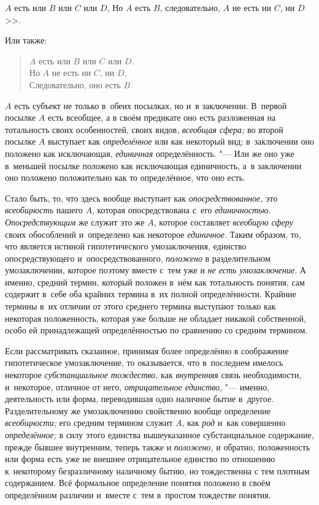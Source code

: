 $A$ есть или $B$ или $C$ или $D$,
Но $A$ есть $B$, следовательно, $A$ не есть ни $C$, ни $D$>>.

Или также:

\begin{verse}
$A$ есть или $B$ или $C$ или $D$.\\
Но $A$ не есть ни $C$, ни $D$,\\
Следовательно, оно есть $B$.
\end{verse}

$A$ есть субъект не только в~обеих посылках, но и~в заключении.
В~первой посылке $A$ есть всеобщее, а
в своём предикате оно есть разложенная на тотальность своих особенностей,
своих видов, {\em всеобщая сфера;} во второй посылке $A$
выступает как {\em определённое} или
как некоторый вид; в~заключении оно положено как исключающая, {\em единичная}
определённость. "--- Или же оно уже в~меньшей
посылке положено как исключающая единичность, а~в заключении оно положено
положительно как то определённое, что оно есть.

Стало быть, то, что здесь вообще выступает как {\em опосредствованное,}
это {\em всеобщность} нашего $A$, которая опосредствована с~его
{\em единичностью}. {\em Опосредствующим} же служит это же $A$,
которое составляет {\em всеобщую сферу}
своих обособлений и~определено как некоторое {\em единичное}. Таким
образом, то, что является истиной гипотетического умозаключения, единство
опосредствующего и~опосредствованного, {\em положено} в
разделительном умозаключении, которое поэтому вместе с~тем уже и
{\em не есть умозаключение}.
А именно, средний термин, который положен в~нём как
тотальность понятия, сам содержит в~себе оба крайних термина в~их полной
определённости. Крайние термины в~их отличии от этого среднего термина
выступают только как некоторая положенность, которая уже больше не обладает
никакой собственной, особо ей принадлежащей определённостью по сравнению со
средним термином.

Если рассматривать сказанное, принимая более определённо в
соображение гипотетическое умозаключение, то оказывается, что в~последнем
имелось некоторое {\em субстанциальное тождество,} как {\em внутренняя} связь
необходимости, и~некоторое, отличное от него,
{\em отрицательное единство,} "---
именно, деятельность или форма, переводившая одно наличное
бытие в~другое. Разделительному же умозаключению свойственно вообще
определение {\em всеобщности;} его средним термином служит $A$,
как {\em род} и~как совершенно {\em определённое;} в
силу этого единства вышеуказанное субстанциальное содержание, прежде бывшее
внутренним, теперь также и {\em положено,} и
обратно, положенность или форма есть уже не внешнее отрицательное единство
по отношению к~некоторому безразличному наличному бытию, но тождественна с
тем плотным содержанием. Всё формальное определение понятия положено в
своём определённом различии и~вместе с~тем в~простом тождестве понятия.

